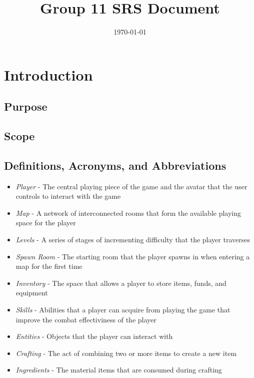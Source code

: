 \documentclass[12pt, titlepage]{article}
\title{Group 11 SRS Document}
\author{}
\date{\today}
\begin{document}
\maketitle

\tableofcontents
\listoftables
\listoffigures

\newpage


\section{Introduction}

  \subsection{Purpose}
  \subsection{Scope}
  \subsection{Definitions, Acronyms, and Abbreviations}

  \begin{itemize}
    \item[] \textit{Player} - The central playing piece of the game and the avatar that the user controls to interact with the game
    \item[] \textit{Map} - A network of interconnected rooms that form the available playing space for the player
    \item[] \textit{Levels} - A series of stages of incrementing difficulty that the player traverses
    \item[] \textit{Spawn Room} - The starting room that the player spawns in when entering a map for the first time
    \item[] \textit{Inventory} - The space that allows a player to store items, funds, and equipment
    \item[] \textit{Skills} - Abilities that a player can acquire from playing the game that improve the combat effectiviness of the player
    \item[] \textit{Entities} - Objects that the player can interact with
    \item[] \textit{Crafting} - The act of combining two or more items to create a new item
    \item[] \textit{Ingredients} - The material items that are consumed during crafting
  \end{itemize}
\end{document}
